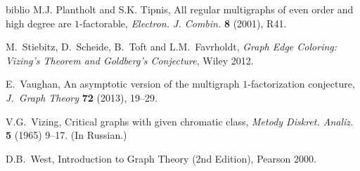 \begin{thebibliography}{biblio}
 M.J. Plantholt and S.K. Tipnis, 
All regular multigraphs of even order and high degree are $1$-factorable, 
\emph{Electron. J. Combin.} {\bf 8} (2001), R41.

 M.~Stiebitz, D.~Scheide, B.~Toft and L.M.~Favrholdt,
\emph{Graph Edge Coloring: Vizing's Theorem and Goldberg's Conjecture}, Wiley 2012.

 E.~Vaughan,
An asymptotic version of the multigraph $1$-factorization conjecture, 
\emph{J.~Graph Theory} {\bf 72} (2013),  19--29.

 V.G.~Vizing, Critical graphs with given chromatic class, \emph{Metody Diskret. Analiz.} {\bf 5} (1965) 9--17. (In Russian.)

 D.B.~West, 
Introduction to Graph Theory (2nd Edition), Pearson 2000.



\end{thebibliography}


